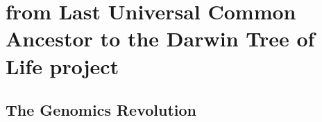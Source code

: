 
\chapter{from Last Universal Common Ancestor to the Darwin Tree of Life project}  %

\ifpdf
    \graphicspath{{Chapter1/Figs/Raster/}{Chapter1/Figs/PDF/}{Chapter1/Figs/}}
\else
    \graphicspath{{Chapter1/Figs/Vector/}{Chapter1/Figs/}}
\fi



\section{The Genomics Revolution}

%
%






